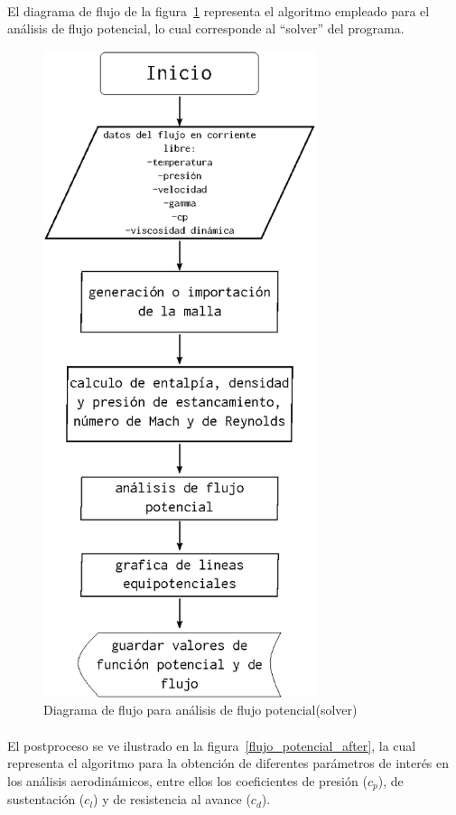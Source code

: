\documentclass[letterpaper, openright, 12pt]{book}
\begin{document}
    \paragraph*{}
        El diagrama de flujo de la figura~\ref{flujo_potencial} representa el
        algoritmo empleado para el análisis de flujo potencial, lo cual
        corresponde al ``solver'' del programa.

    \begin{figure}[htbp!]
        \centering
        \includegraphics[keepaspectratio, width=80mm]{./img/flujo_potencial}
        \caption{Diagrama de flujo para análisis de flujo potencial(solver)}
        \label{flujo_potencial}
    \end{figure}

    \paragraph*{}
        El postproceso se ve ilustrado en la figura~\ref{flujo_potencial_after},
        la cual representa el algoritmo para la obtención de diferentes
        parámetros de interés en los análisis aerodinámicos, entre ellos los
        coeficientes de presión ($c_p$), de sustentación ($c_l$) y de
        resistencia al avance ($c_d$).
\end{document}
